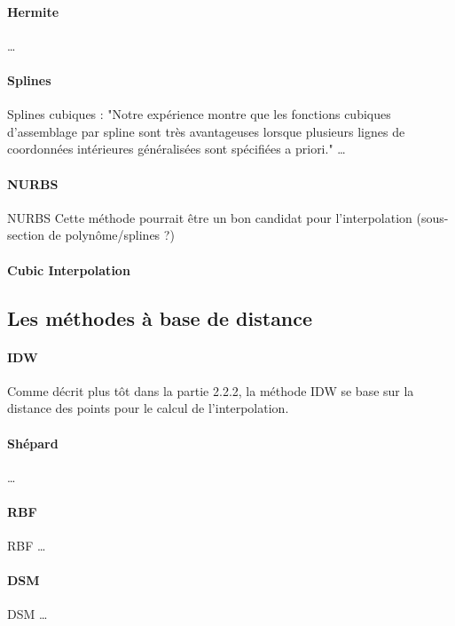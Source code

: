 \paragraph{Hermite}
\cite{bajaj}
\vspace{0.5cm}
\dots
\paragraph{Splines}
Splines cubiques : "Notre expérience montre que les fonctions cubiques d'assemblage par spline sont très avantageuses lorsque plusieurs lignes de coordonnées intérieures généralisées sont spécifiées a priori."\cite{gordont1971}
\vspace{0.5cm}
\dots
\paragraph{NURBS}
\vspace{0.5cm}
\ac{NURBS}
Cette méthode\cite{piegl1995nurbs} pourrait être un bon candidat pour l'interpolation (sous-section de polynôme/splines ?)
\vspace{0.5cm}

\paragraph{Cubic Interpolation}
\cite{tanaka}
\vspace{0.5cm}


\subsection{Les méthodes à base de distance}
\paragraph{IDW}
\vspace{0.5cm}
Comme décrit plus tôt dans la partie 2.2.2, la méthode IDW se base sur la distance des points pour le calcul de l'interpolation.
\paragraph{Shépard}
\vspace{0.5cm}
\dots
\paragraph{RBF}
\ac{RBF}
\vspace{0.5cm}
\dots
\paragraph{DSM}
\ac{DSM}
\cite{kim2019}
\vspace{0.5cm}
\dots


